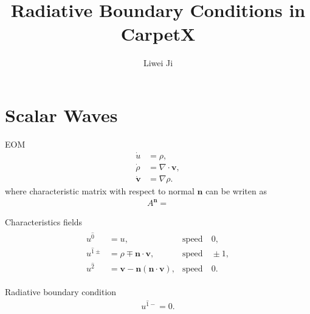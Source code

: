 \documentclass[prd,aps,a4paper,superscriptaddress,onecolumn,footinbib]{revtex4}
\begin{document}
\title{Radiative Boundary Conditions in CarpetX}

\author{Liwei Ji}

\maketitle

\tableofcontents



\section{Scalar Waves}

EOM
\begin{align}
  \dot{u}
  &=\rho, \\
  \dot{\rho}
  &=\nabla \cdot \bm{v}, \\
  \dot{\bm{v}}
  &=\nabla \rho.
\end{align}
where characteristic matrix with respect to normal $\bm{n}$ can be writen as
\begin{align}
  A^{\bm{n}}=
\end{align}

Characteristics fields
\begin{align}
  \begin{array}{lll}
    u^{\hat{0}}    &=u, \quad                          &\text{speed} \quad 0, \\
    u^{\hat{1}\pm} &=\rho\mp\bm{n}\cdot\bm{v},         &\text{speed} \quad \pm 1, \\
    u^{\hat{2}}    &=\bm{v}-\bm{n}(\bm{n}\cdot\bm{v}), &\text{speed} \quad 0.
  \end{array}
\end{align}

Radiative boundary condition
\begin{align}
  u^{\hat{1}-}=0.
\end{align}









%
\end{document}
